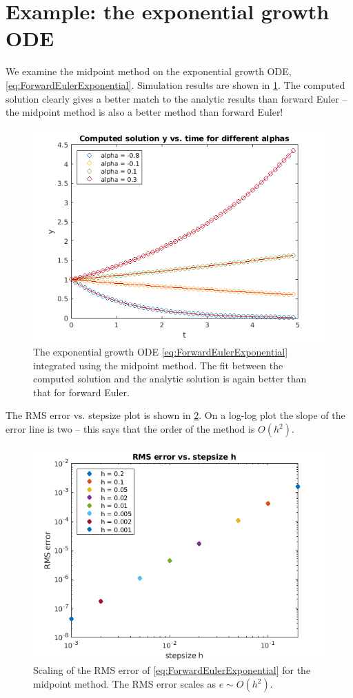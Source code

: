 \documentclass[hidelinks,notitlepage]{book}
\begin{document}
\section{Example: the exponential growth ODE}
We examine the midpoint method on the exponential growth ODE, \cref{eq:ForwardEulerExponential}.  Simulation results are shown in \cref{fig:MidpointMethodExponential}.  The computed solution clearly gives a better match to the analytic results than forward Euler -- the midpoint method is also a better method than forward Euler!
\begin{figure}[h]
	\centering
	\includegraphics[width=0.7\columnwidth]{MidpointMethodExponential.png}
	\caption{The exponential growth ODE \cref{eq:ForwardEulerExponential} integrated using the midpoint method.  The fit between the computed solution and the analytic solution is again better than that for forward Euler.}
	\label{fig:MidpointMethodExponential}
\end{figure}
The RMS error vs. stepsize plot is shown in \cref{fig:MidpointMethodExponentialErr}.  On a log-log plot the slope of the error line is two -- this says that the order of the method is $O(h^2)$.
\begin{figure}[h]
	\centering
	\includegraphics[width=0.7\columnwidth]{MidpointMethodExponentialErr.png}
	\caption{Scaling of the RMS error of \cref{eq:ForwardEulerExponential} for the midpoint method.  The RMS error scales as $e \sim O(h^2)$.}
	\label{fig:MidpointMethodExponentialErr}
\end{figure}
\end{document}
